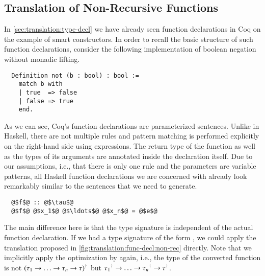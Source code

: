 \subsection{Translation of Non-Recursive Functions} \label{sec:translation:func-decl:non-rec}
In \autoref{sec:translation:type-decl} we have already seen function declarations in Coq on the example of smart constructors.
In order to recall the basic structure of such function declarations, consider the following implementation of boolean negation without monadic lifting.
\begin{verbatim}
  Definition not (b : bool) : bool :=
    match b with
    | true  => false
    | false => true
    end.
\end{verbatim}
As we can see, Coq's function declarations are parameterized  sentences.
Unlike in Haskell, there are not multiple rules and pattern matching is performed explicitly on the right-hand side using  expressions.
The return type of the function as well as the types of its arguments are annotated inside the declaration itself.
Due to our assumptions, i.e., that there is only one rule and the parameters are variable patterns, all Haskell function declarations we are concerned with already look remarkably similar to the  sentences that we need to generate.
\begin{verbatim}
  @$f$@ :: @$\tau$@
  @$f$@ @$x_1$@ @$\ldots$@ @$x_n$@ = @$e$@
\end{verbatim}
The main difference here is that the type signature is independent of the actual function declaration.
If we had a type signature of the form , we could apply the translation proposed in \autoref{fig:translation:func-decl:non-rec} directly.
Note that we implicitly apply the optimization by \cite{Abel:2005} again, i.e.,
the type of the converted function is not ${(\tau_1 \rightarrow \ldots \rightarrow \tau_n \rightarrow \tau)}^{\dagger}$ but ${\tau_1}^{\dagger} \rightarrow \ldots \rightarrow {\tau_n}^{\dagger} \rightarrow {\tau}^{\dagger}$.

